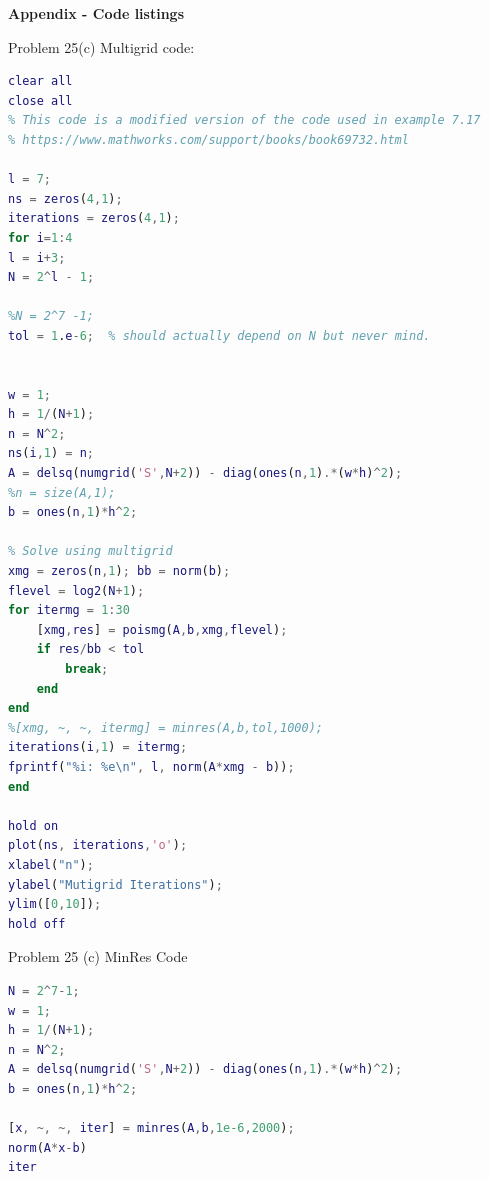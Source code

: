 \documentclass[12pt]{article}
\begin{document}
\bigbreak

{\hspace{-4 ex} \huge \textbf{Appendix - Code listings}}\bigbreak

\large{Problem 25(c) Multigrid code:}
\begin{lstlisting}[language=MATLAB]
clear all
close all
% This code is a modified version of the code used in example 7.17
% https://www.mathworks.com/support/books/book69732.html

l = 7;
ns = zeros(4,1);
iterations = zeros(4,1);
for i=1:4
l = i+3;
N = 2^l - 1;

%N = 2^7 -1;
tol = 1.e-6;  % should actually depend on N but never mind.


w = 1;
h = 1/(N+1);
n = N^2;
ns(i,1) = n;
A = delsq(numgrid('S',N+2)) - diag(ones(n,1).*(w*h)^2);
%n = size(A,1);
b = ones(n,1)*h^2;

% Solve using multigrid
xmg = zeros(n,1); bb = norm(b);
flevel = log2(N+1);
for itermg = 1:30
	[xmg,res] = poismg(A,b,xmg,flevel);
	if res/bb < tol
		break;
	end
end
%[xmg, ~, ~, itermg] = minres(A,b,tol,1000);
iterations(i,1) = itermg;
fprintf("%i: %e\n", l, norm(A*xmg - b));
end

hold on
plot(ns, iterations,'o');
xlabel("n");
ylabel("Mutigrid Iterations");
ylim([0,10]);
hold off
\end{lstlisting}

\large{Problem 25 (c) MinRes Code}
\begin{lstlisting}[language=MATLAB]
N = 2^7-1;
w = 1;
h = 1/(N+1);
n = N^2;
A = delsq(numgrid('S',N+2)) - diag(ones(n,1).*(w*h)^2);
b = ones(n,1)*h^2;

[x, ~, ~, iter] = minres(A,b,1e-6,2000);
norm(A*x-b)
iter
\end{lstlisting}
\end{document}

